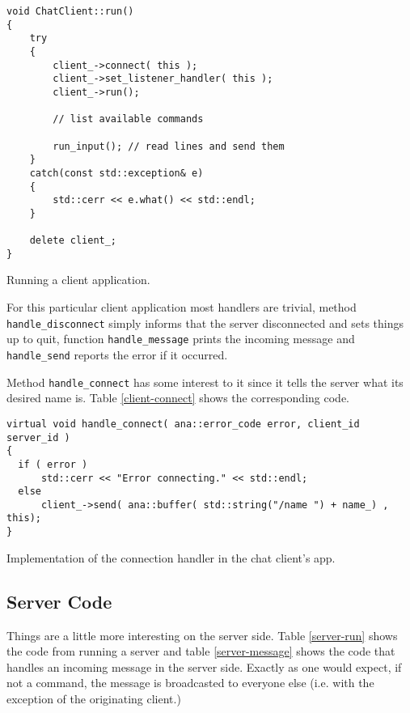 \documentclass[a4paper,12pt,english]{article}
\begin{document}
\begin{table}[!htb]
\lstset{language=C++}
\begin{lstlisting}[frame=single]
void ChatClient::run()
{
    try
    {
        client_->connect( this );
        client_->set_listener_handler( this );
        client_->run();

        // list available commands

        run_input(); // read lines and send them
    }
    catch(const std::exception& e)
    {
        std::cerr << e.what() << std::endl;
    }

    delete client_;
}
\end{lstlisting}
\centering \caption{Running a client application.} 
\label{client-run}
\end{table}

For this particular client application most handlers are trivial, method
\texttt{handle\_disconnect} simply informs that the server disconnected
and sets things up to quit, function \texttt{handle\_message} prints the
incoming message and \texttt{handle\_send} reports the error if it occurred.

Method \texttt{handle\_connect} has some interest to it since it tells the
server what its desired name is. Table \ref{client-connect} shows the
corresponding code.

\begin{table}[!htb]
\lstset{language=C++}
\begin{lstlisting}[frame=single]
virtual void handle_connect( ana::error_code error, client_id server_id )
{
  if ( error )
      std::cerr << "Error connecting." << std::endl;
  else
      client_->send( ana::buffer( std::string("/name ") + name_) , this);
}
\end{lstlisting}
\centering \caption{Implementation of the connection handler in the chat client's app.} 
\label{client-connect}
\end{table}

\subsection{Server Code}

Things are a little more interesting on the server side. Table \ref{server-run}
shows the code from running a server and table \ref{server-message} shows the
code that handles an incoming message in the server side. Exactly as one would
expect, if not a command, the message is broadcasted to everyone else (i.e.
with the exception of the originating client.)
\end{document}
